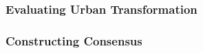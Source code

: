 \subsubsection*{Evaluating Urban Transformation}
\begin{bibunit}[unsrt]
\nocite{*}
\end{bibunit}
\subsubsection*{Constructing Consensus}
\begin{bibunit}[unsrt]
\nocite{*}
\end{bibunit}
